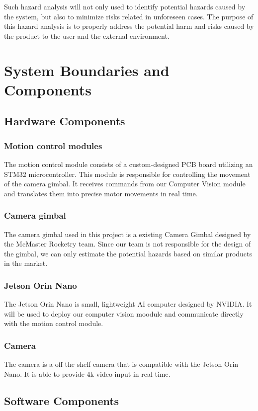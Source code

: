 \documentclass{article}
\begin{document}
Such hazard analysis will not only used to identify potential hazards caused by the 
system, but also to minimize risks related in unforeseen cases. The purpose of this 
hazard analysis is to properly address the potential harm and risks caused by the 
product to the user and the external environment.

\section{System Boundaries and Components}

\subsection{Hardware Components}
\subsubsection{Motion control modules}
The motion control module consists of a custom-designed PCB board utilizing an STM32 
microcontroller. This module is responsible for controlling the movement of the camera
gimbal. It receives commands from our Computer Vision module and translates them into
precise motor movements in real time. 
\subsubsection{Camera gimbal}
The camera gimbal used in this project is a existing Camera Gimbal designed by the 
McMaster Rocketry team. Since our team is not responsible for the design of the gimbal, 
we can only estimate the potential hazards based on similar products in the market. 
\subsubsection{Jetson Orin Nano}
The Jetson Orin Nano is small, lightweight AI computer designed by NVIDIA. It will
be used to deploy our computer vision moodule and communicate directly with the motion
control module.
\subsubsection{Camera}
The camera is a off the shelf camera that is compatible with the Jetson Orin Nano. It 
is able to provide 4k video input in real time. 

\subsection{Software Components}
\end{document}
